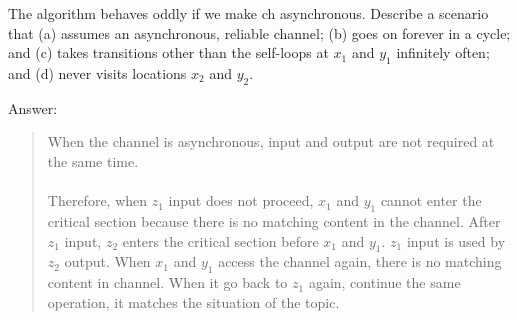 \documentclass{article}
\begin{document}
\begin{Question} 
\begin{Subquestion}
    The algorithm behaves oddly if we make ch asynchronous. Describe a scenario that (a) assumes an asynchronous, reliable channel; (b) goes on forever in a cycle; and (c) takes transitions other than the self-loops at $x_1$ and $y_1$ infinitely often; and (d) never visits locations $x_2$ and $y_2$.
\begin{answer}
    Answer:
\begin{quote}
    When the channel is asynchronous, input and output are not required at the same time. \\\\
    Therefore, when $z_1$ input does not proceed, $x_1$ and $y_1$ cannot enter the critical section because there is no matching content in the channel. After $z_1$ input, $z_2$ enters the critical section before $x_1$ and $y_1$. $z_1$ input is used by $z_2$ output. When $x_1$ and $y_1$ access the channel again, there is no matching content in channel. When it go back to $z_1$ again, continue the same operation, it matches the situation of the topic.\\
\end{quote}
\end{answer}
\end{Subquestion}
    

\end{Question}
\end{document}
